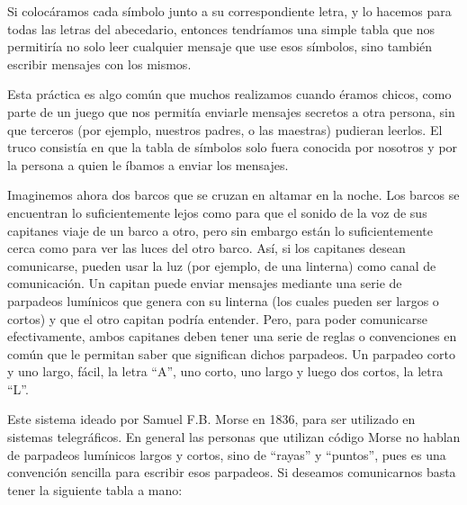 Si colocáramos cada símbolo junto a su correspondiente letra, y lo hacemos para
todas las letras del abecedario, entonces tendríamos una simple tabla que nos
permitiría no solo leer cualquier mensaje que use esos símbolos, sino también
escribir mensajes con los mismos.

Esta práctica es algo común que muchos realizamos cuando éramos chicos, como
parte de un juego que nos permitía enviarle mensajes secretos a otra persona,
sin que terceros (por ejemplo, nuestros padres, o las maestras) pudieran
leerlos. El truco consistía en que la tabla de símbolos solo fuera conocida
por nosotros y por la persona a quien le íbamos a enviar los mensajes.

Imaginemos ahora dos barcos que se cruzan en altamar en la noche. Los barcos se
encuentran lo suficientemente lejos como para que el sonido de la voz de sus
capitanes viaje de un barco a otro, pero sin embargo están lo suficientemente
cerca como para ver las luces del otro barco. Así, si los capitanes desean
comunicarse, pueden usar la luz (por ejemplo, de una linterna) como canal de
comunicación. Un capitan puede enviar mensajes mediante una serie de parpadeos
lumínicos que genera con su linterna (los cuales pueden ser largos o cortos) y
que el otro capitan podría entender. Pero, para poder comunicarse efectivamente,
ambos capitanes deben tener una serie de reglas o convenciones en común que le
permitan saber que significan dichos parpadeos. Un parpadeo corto y uno largo,
fácil, la letra ``A'', uno corto, uno largo y luego dos cortos, la letra ``L''.

Este sistema ideado por Samuel F.B. Morse en 1836, para ser utilizado en sistemas
telegráficos. En general las personas que utilizan código Morse no hablan de
parpadeos lumínicos largos y cortos, sino de ``rayas'' y ``puntos'', pues es una
convención sencilla para escribir esos parpadeos. Si deseamos comunicarnos basta
tener la siguiente tabla a mano:

